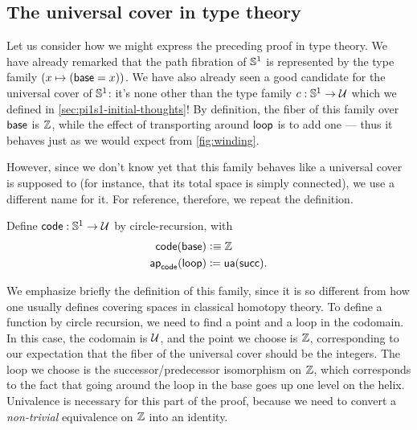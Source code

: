 %

\subsection{The universal cover in type theory}
\label{sec:pi1s1-universal-cover}

%
%
%

Let us consider how we might express the preceding proof in type theory.
We have already remarked that the path fibration of $\mathbb{S}^1$ is represented by the type family $(x\mapsto (\mathsf{base}=x))$.
We have also already seen a good candidate for the universal cover of $\mathbb{S}^1$: it's none other than the type family $c:\mathbb{S}^1\to\mathcal{U}$ which we defined in \cref{sec:pi1s1-initial-thoughts}!
By definition, the fiber of this family over $\mathsf{base}$ is $\mathbb{Z}$, while the effect of transporting around $\mathsf{loop}$ is to add one --- thus it behaves just as we would expect from \cref{fig:winding}.

However, since we don't know yet that this family behaves like a universal cover is supposed to (for instance, that its total space is simply connected), we use a different name for it.
For reference, therefore, we repeat the definition.

\begin{defn} \label{S1-universal-cover}
  Define $\mathsf{code} : \mathbb{S} ^1 \to \mathcal{U}$ by circle-recursion, with
  \begin{align*}
    \mathsf{code}(\mathsf{base}) &\vcentcolon\equiv \mathbb{Z} \\
    \mathsf{ap}_{\mathsf{code}}({\mathsf{loop}}) &\coloneqq \mathsf{ua}(\mathsf{succ}).
  \end{align*}
\end{defn}

We emphasize briefly the definition of this family, since it is so different from how one usually defines covering spaces in classical homotopy theory.
To define a function by circle recursion, we need to find a point and a
loop in the codomain.  In this case, the codomain is $\mathcal{U}$, and the point
we choose is $\mathbb{Z}$, corresponding to our expectation that the
fiber of the universal cover should be the integers.  The loop we choose
is the successor/predecessor
%
%
isomorphism on $\mathbb{Z}$, which
corresponds to the fact that going around the loop in the base goes up
one level on the helix.  Univalence is necessary for this part of the
proof, because we need to convert a \emph{non-trivial} equivalence on $\mathbb{Z}$ into an identity.

